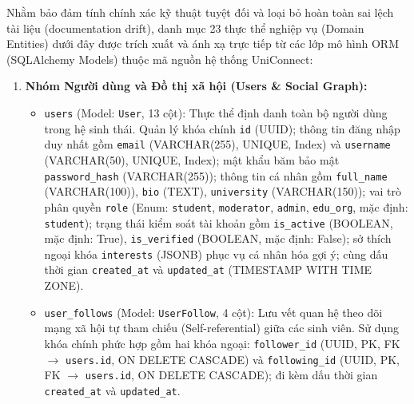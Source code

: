 Nhằm bảo đảm tính chính xác kỹ thuật tuyệt đối và loại bỏ hoàn toàn sai lệch tài liệu (documentation drift), danh mục 23 thực thể nghiệp vụ (Domain Entities) dưới đây được trích xuất và ánh xạ trực tiếp từ các lớp mô hình ORM (SQLAlchemy Models) thuộc mã nguồn hệ thống UniConnect:

\begin{enumerate}
    \item \textbf{Nhóm Người dùng và Đồ thị xã hội (Users \& Social Graph):}
    \begin{itemize}
        \item \texttt{users} (Model: \texttt{User}, 13 cột): Thực thể định danh toàn bộ người dùng trong hệ sinh thái. Quản lý khóa chính \texttt{id} (UUID); thông tin đăng nhập duy nhất gồm \texttt{email} (VARCHAR(255), UNIQUE, Index) và \texttt{username} (VARCHAR(50), UNIQUE, Index); mật khẩu băm bảo mật \texttt{password\_hash} (VARCHAR(255)); thông tin cá nhân gồm \texttt{full\_name} (VARCHAR(100)), \texttt{bio} (TEXT), \texttt{university} (VARCHAR(150)); vai trò phân quyền \texttt{role} (Enum: \texttt{student}, \texttt{moderator}, \texttt{admin}, \texttt{edu\_org}, mặc định: \texttt{student}); trạng thái kiểm soát tài khoản gồm \texttt{is\_active} (BOOLEAN, mặc định: True), \texttt{is\_verified} (BOOLEAN, mặc định: False); sở thích ngoại khóa \texttt{interests} (JSONB) phục vụ cá nhân hóa gợi ý; cùng dấu thời gian \texttt{created\_at} và \texttt{updated\_at} (TIMESTAMP WITH TIME ZONE).
        \item \texttt{user\_follows} (Model: \texttt{UserFollow}, 4 cột): Lưu vết quan hệ theo dõi mạng xã hội tự tham chiếu (Self-referential) giữa các sinh viên. Sử dụng khóa chính phức hợp gồm hai khóa ngoại: \texttt{follower\_id} (UUID, PK, FK $\rightarrow$ \texttt{users.id}, ON DELETE CASCADE) và \texttt{following\_id} (UUID, PK, FK $\rightarrow$ \texttt{users.id}, ON DELETE CASCADE); đi kèm dấu thời gian \texttt{created\_at} và \texttt{updated\_at}.
    \end{itemize}


\end{enumerate}
